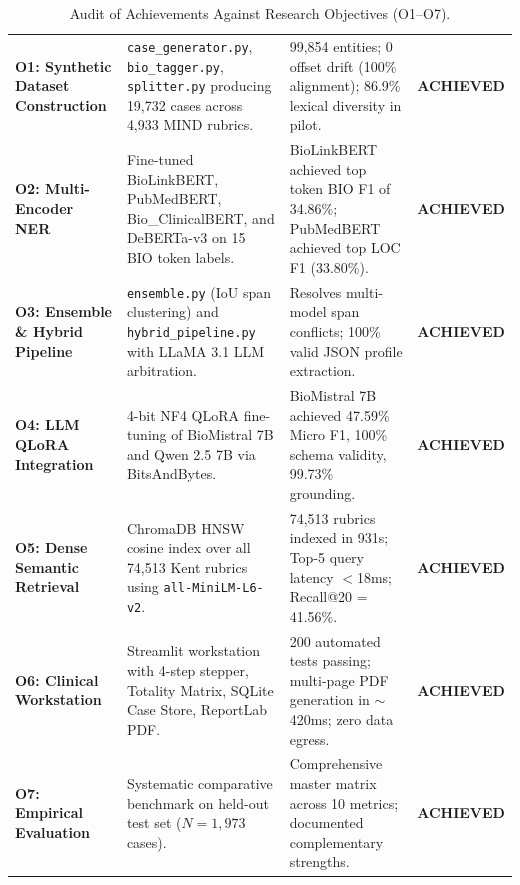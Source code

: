 \begin{table}[htbp]
\caption[Achievements Against Research Objectives]{Audit of Achievements Against Research Objectives (O1--O7).}
\label{tab:objectives_achieved}
\centering
\scriptsize
\begin{tabular}{P{3.2cm}P{5.5cm}P{4cm}c}
\toprule
{} &  &  &  \\
\midrule
\textbf{O1: Synthetic Dataset Construction} & \texttt{case\_generator.py}, \texttt{bio\_tagger.py}, \texttt{splitter.py} producing 19,732 cases across 4,933 MIND rubrics. & 99,854 entities; 0 offset drift (100\% alignment); 86.9\% lexical diversity in pilot. & \textbf{ACHIEVED} \\
\midrule
\textbf{O2: Multi-Encoder NER} & Fine-tuned BioLinkBERT, PubMedBERT, Bio\_ClinicalBERT, and DeBERTa-v3 on 15 BIO token labels. & BioLinkBERT achieved top token BIO F1 of 34.86\%; PubMedBERT achieved top LOC F1 (33.80\%). & \textbf{ACHIEVED} \\
\midrule
\textbf{O3: Ensemble \& Hybrid Pipeline} & \texttt{ensemble.py} (IoU span clustering) and \texttt{hybrid\_pipeline.py} with LLaMA 3.1 LLM arbitration. & Resolves multi-model span conflicts; 100\% valid JSON profile extraction. & \textbf{ACHIEVED} \\
\midrule
\textbf{O4: LLM QLoRA Integration} & 4-bit NF4 QLoRA fine-tuning of BioMistral 7B and Qwen 2.5 7B via BitsAndBytes. & BioMistral 7B achieved 47.59\% Micro F1, 100\% schema validity, 99.73\% grounding. & \textbf{ACHIEVED} \\
\midrule
\textbf{O5: Dense Semantic Retrieval} & ChromaDB HNSW cosine index over all 74,513 Kent rubrics using \texttt{all-MiniLM-L6-v2}. & 74,513 rubrics indexed in 931s; Top-5 query latency $<$18ms; Recall@20 = 41.56\%. & \textbf{ACHIEVED} \\
\midrule
\textbf{O6: Clinical Workstation} & Streamlit workstation with 4-step stepper, Totality Matrix, SQLite Case Store, ReportLab PDF. & 200 automated tests passing; multi-page PDF generation in $\sim$420ms; zero data egress. & \textbf{ACHIEVED} \\
\midrule
\textbf{O7: Empirical Evaluation} & Systematic comparative benchmark on held-out test set ($N = 1,973$ cases). & Comprehensive master matrix across 10 metrics; documented complementary strengths. & \textbf{ACHIEVED} \\
\bottomrule
\end{tabular}
\end{table}

